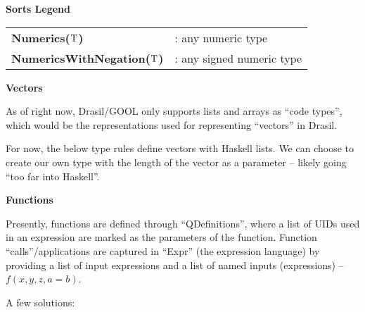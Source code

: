 \begin{center}
    \textbf{Sorts Legend}
    \begin{tabular}{ l l }
        \textbf{Numerics($\mathrm{T}$)} &: any numeric type \\
        \textbf{NumericsWithNegation($\mathrm{T}$)} &: any signed numeric type
    \end{tabular}
    
\end{center}

\textbf{Vectors}

As of right now, Drasil/GOOL only supports lists and arrays as ``code types'', 
which would be the representations used for representing ``vectors'' in Drasil.


For now, the below type rules define vectors with Haskell lists. We can choose to
create our own type with the length of the vector as a parameter -- likely going
``too far into Haskell''.

\textbf{Functions}

Presently, functions are defined through ``QDefinitions'', where a list of
UIDs used in an expression are marked as the parameters of the function. Function
``calls''/applications are captured in ``Expr'' (the expression language) by
providing a list of input expressions and a list of named inputs (expressions) -- 
$f(x,y,z,a=b)$.



A few solutions:

